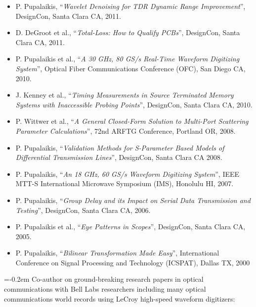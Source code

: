 \documentclass[10pt,letterpaper]{extarticle}
\newenvironment{indentsection}[1]%
{\begin{list}{}%
	{\setlength{\leftmargin}{#1}}%
	\item[]%
}
{\end{list}}
\begin{document}
\begin{indentsection}{-1em}
\begin{itemize}
\item P. Pupalaikis, “\emph{Wavelet Denoising for TDR Dynamic Range Improvement}”, DesignCon, Santa Clara CA, 2011.
\item D. DeGroot et al., “\emph{Total-Loss: How to Qualify PCBs}”, DesignCon, Santa Clara CA, 2011. 
\item P. Pupalaikis et al., “\emph{A 30 GHz, 80 GS/s Real-Time Waveform Digitizing System}”, Optical Fiber Communications Conference (OFC), San Diego CA, 2010. 
\item J. Kenney et al., “\emph{Timing Measurements in Source Terminated Memory Systems with Inaccessible Probing Points}”, DesignCon, Santa Clara CA, 2010. 
\item P. Wittwer et al., “\emph{A General Closed-Form Solution to Multi-Port Scattering Parameter Calculations}”, 72nd ARFTG Conference, Portland OR, 2008.
\item P. Pupalaikis, “\emph{Validation Methods for S-Parameter Based Models of Differential Transmission Lines}”, DesignCon, Santa Clara CA 2008. 
\item P. Pupalaikis, “\emph{An 18 GHz, 60 GS/s Waveform Digitizing System}”, IEEE MTT-S International Microwave Symposium (IMS), Honolulu HI, 2007. 
\item P. Pupalaikis, “\emph{Group Delay and its Impact on Serial Data Transmission and Testing}”, DesignCon, Santa Clara CA, 2006. 
\item P. Pupalaikis et al., “\emph{Eye Patterns in Scopes}”, DesignCon, Santa Clara CA, 2005. 
\item P. Pupalaikis, “\emph{Bilinear Transformation Made Easy}”, International Conference on Signal Processing and Technology (ICSPAT), Dallas TX, 2000 
\end{itemize}\end{indentsection}
\begin{flushleft} 
\parskip=-0.2em
Co-author on ground-breaking research papers in optical communications with Bell Labs researchers including many optical communications world records using LeCroy high-speed waveform digitizers:
\end{flushleft}
\end{document}
